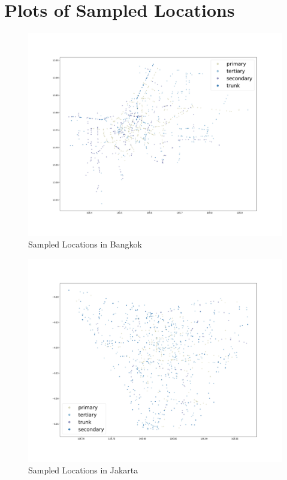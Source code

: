 \documentclass[12pt, letterpaper]{article}
\begin{document}
\section{Plots of Sampled Locations}
\begin{figure}
\centering
\setlength{\abovecaptionskip}{5pt plus 3pt minus 2pt}\caption{Sampled Locations in Bangkok}\label{fig:bangkok_sample}
\includegraphics[scale=0.5]{../figs/bangkok.pdf}
\end{figure}

\begin{figure}
\centering
\caption{Sampled Locations in Jakarta}\label{fig:jakarta_sample}
\includegraphics[scale=0.5]{../figs/jakarta.pdf}
\end{figure}
\end{document}
